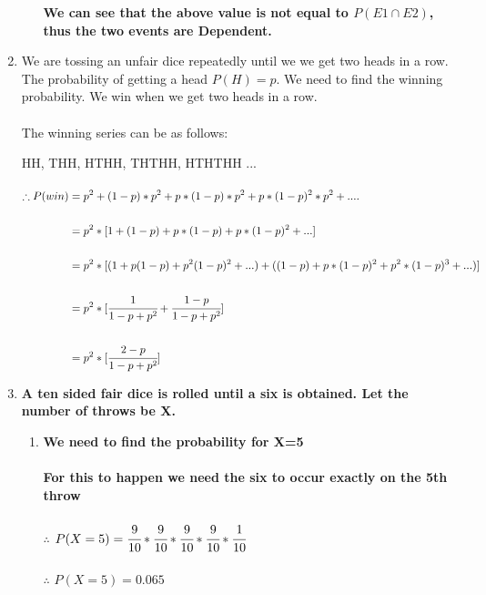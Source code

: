 \documentclass{article}
\begin{document}
\begin{enumerate}
\begin{enumerate}
    \textbf{We can see that the above value is not equal to $P(E1 \cap E2)$, thus the two events are Dependent. }
\end{enumerate}
            


\newpage

\item \large We are tossing an unfair dice repeatedly until we we get two heads in a row. The probability of getting a head $P(H) = p$. We need to find the winning probability. We win when we get two heads in a row. \\\\

The winning series can be as follows:

HH, THH, HTHH, THTHH, HTHTHH ... \\\\

$\begin{aligned}
    \therefore P(win) &= p^2 + (1-p)*p^2 + p*(1-p)*p^2 + p*(1-p)^2*p^2 + ....\\\\
    &= p^2*[1 + (1-p) + p*(1-p) + p*(1-p)^2 + ...]\\\\
    &= p^2*[(1 + p(1-p) + p^2(1-p)^2 + ...) + ((1-p) + p*(1-p)^2 + p^2*(1-p)^3 + ...)]\\\\
    &= p^2*[\cfrac{1}{1-p+p^2} + \cfrac{1-p}{1-p+p^2}]\\\\
    &= p^2*[\cfrac{2-p}{1-p+p^2}]
\end{aligned}$
\newpage

\item \large \textbf{A ten sided fair dice is rolled until a six is obtained. Let the number of throws be X.}
\begin{enumerate}
\item \textbf{We need to find the probability for X=5}\\\\
\textbf{For this to happen we need the six to occur exactly on the 5th throw}\\\\
$\therefore$ $P(X = 5) = \cfrac{9}{10}*\cfrac{9}{10}*\cfrac{9}{10}*\cfrac{9}{10}*\cfrac{1}{10}$\\\\

$\therefore$ $P(X = 5) = 0.065$\\\\\


\end{enumerate}
\end{enumerate}
\end{document}
